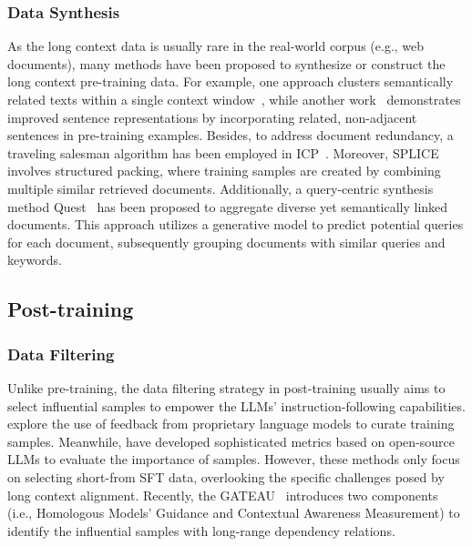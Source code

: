 \documentclass[11pt, a4paper, logo, copyright, nonumbering]{map}
\begin{document}
\subsubsection{Data Synthesis}
As the long context data is usually rare in the real-world corpus (e.g., web documents),
many methods have been proposed to synthesize or construct the long context pre-training data.
For example,
one approach clusters semantically related texts within a single context window~\citep{realm}, while another work~\citep{levine2022the} demonstrates improved sentence representations by incorporating related, non-adjacent sentences in pre-training examples. 
Besides, to address document redundancy, a traveling salesman algorithm has been employed in ICP~\citep{Shi2023InContextPL}. 
Moreover, SPLICE~\citep{spacking} involves structured packing, where training samples are created by combining multiple similar retrieved documents. Additionally, a query-centric synthesis method Quest~\citep{quest} has been proposed to aggregate diverse yet semantically linked documents. This approach utilizes a generative model to predict potential queries for each document, subsequently grouping documents with similar queries and keywords.


\subsection{Post-training}
\label{sec:sft_data}









\subsubsection{Data Filtering}
Unlike pre-training,
the data filtering strategy in post-training usually aims to select influential samples to empower the LLMs’ instruction-following capabilities.
\citet{chen2024alpagasus, liu2024what, Chen2025LADMLT, wu2025longattn} explore the use of feedback from proprietary language models to curate training samples.
Meanwhile,
\citet{cao2024instruction, Li2023FromQT, ge-etal-2024-clustering, xia2024less} 
have developed sophisticated metrics based on open-source LLMs to evaluate the importance of samples.
However, these methods only focus on selecting short-from SFT data, overlooking the specific challenges posed by long context alignment.
Recently,
the GATEAU~\citep{geteau} introduces two components (i.e., Homologous Models' Guidance and Contextual Awareness Measurement) to identify the influential samples with long-range dependency relations.
\end{document}
